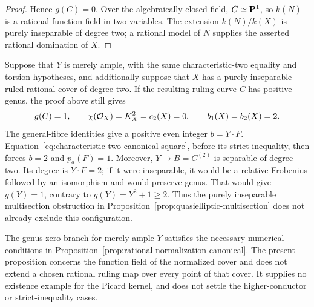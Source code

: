 \begin{proof}
Hence $g(C)=0$. Over the algebraically closed field, $C\simeq\mathbf P^1$,
so $k(N)$ is a rational function field in two variables.
The extension $k(N)/k(X)$ is purely inseparable of degree two;
a rational model of $N$ supplies the asserted rational domination
of $X$.
\end{proof}

\begin{remark}\label{rem:characteristic-two-ample-residual}
Suppose that $Y$ is merely ample, with the same characteristic-two
equality and torsion hypotheses, and additionally suppose that $X$
has a purely inseparable ruled rational cover of degree two.
If the resulting ruling curve $C$ has positive genus, the proof
above still gives
\[
 g(C)=1,\qquad
 \chi(\mathcal O_X)=K_X^2=c_2(X)=0,\qquad b_1(X)=b_2(X)=2.
\]
The general-fibre identities give a positive even integer $b=Y\cdot F$.
Equation~\eqref{eq:characteristic-two-canonical-square}, before its
strict inequality, then forces $b=2$ and $p_a(F)=1$.
Moreover, $Y\to B=C^{(2)}$ is separable of degree two. Its degree is
$Y\cdot F=2$; if it were inseparable, it would be a relative
Frobenius followed by an isomorphism and would preserve genus.
That would give $g(Y)=1$, contrary to $g(Y)=Y^2+1\geq2$.
Thus the purely inseparable multisection obstruction in
Proposition~\ref{prop:quasielliptic-multisection} does not already
exclude this configuration.

The genus-zero branch for merely ample $Y$ satisfies the necessary
numerical conditions in Proposition~\ref{prop:rational-normalization-canonical}.
The present proposition concerns the function field of the normalized
cover and does not extend a chosen rational ruling map over
every point of that cover. It supplies no existence example for
the Picard kernel, and does not settle the higher-conductor
or strict-inequality cases.
\end{remark}
